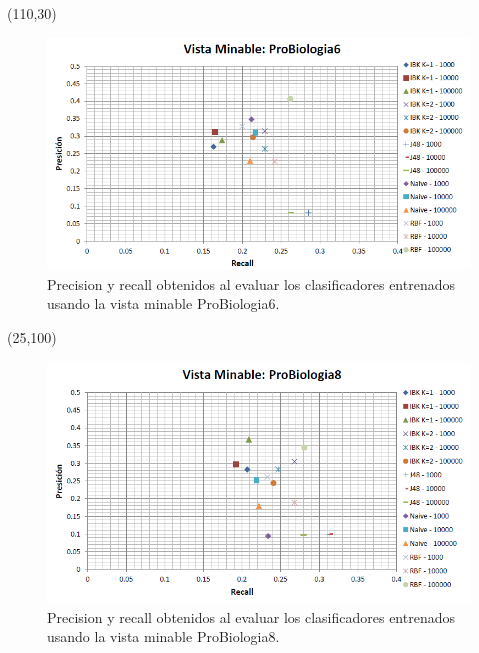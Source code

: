 \documentclass{article}
\begin{document}
\begin{textblock}{80}(110,30)
\begin{figure}[!htb]
\begin{centering}
\includegraphics[scale=0.4]{probiologia6}
\par\end{centering}
\caption{Precision y recall obtenidos al evaluar los clasificadores entrenados usando la vista minable ProBiologia6.}
\label{fig:figura12}
\end{figure}
\end{textblock}

\begin{textblock}{80}(25,100)
\begin{figure}[!htb]
\begin{centering}
\includegraphics[scale=0.4]{probiologia8}
\par\end{centering}
\caption{Precision y recall obtenidos al evaluar los clasificadores entrenados usando la vista minable ProBiologia8.}
\label{fig:figura13}
\end{figure}
\end{textblock}
\end{document}
